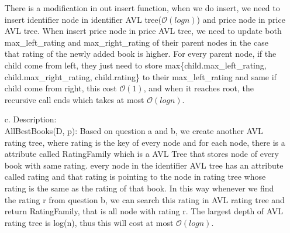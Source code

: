 \documentclass[10pt]{article}
\begin{document}
\begin{enumerate}
There is a modification in out insert function, when we do insert, we need to insert identifier node in identifier AVL tree($\mathcal{O}(logn)$) and price node in price AVL tree. When insert price node in price AVL tree, we need to update both max\_left\_rating and  max\_right\_rating of their parent nodes in the case that rating of the newly added book is higher. For every parent node, if the child come from left, they just need to store max\{child.max\_left\_rating, child.max\_right\_rating, child.rating\} to their max\_left\_rating and same if child come from right, this cost $\mathcal{O}(1)$, and when it reaches root, the recursive call ends which takes at most $\mathcal{O}(logn)$. 

\item[c.]Description:\\
AllBestBooks(D, p): Based on question a and b, we create another AVL rating tree, where rating is the key of every node and for each node, there is a attribute called RatingFamily which is a AVL Tree that stores node of every book with same rating. every node in the identifier AVL tree has an attribute called rating and that rating is pointing to the node in rating tree whose rating is the same as the rating of that book. In this way whenever we find the rating r from question b, we can search this rating in AVL rating tree and return RatingFamily, that is all node with rating r. The largest depth of AVL rating tree is log(n), thus this will cost at most $\mathcal{O}(logn)$. 


\end{enumerate}
\end{document}
